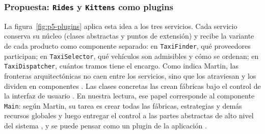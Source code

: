 \subsubsection{Propuesta: \texttt{Rides} y \texttt{Kittens} como plugins}

La figura~\ref{fig:p5-plugins} aplica esta idea a los tres servicios. Cada servicio conserva su
núcleo (clases abstractas y puntos de extensión) y recibe la variante de cada producto como
componente separado: en \texttt{TaxiFinder}, qué proveedores participan; en \texttt{TaxiSelector},
qué vehículos son admisibles y cómo se ordenan; en \texttt{TaxiDispatcher}, cuántos tramos tiene el
encargo. Como indica Martin, las fronteras arquitectónicas no caen entre los servicios, sino que los
atraviesan y los dividen en componentes \parencite[p.~246]{martin2017clean}. Las clases concretas
las crean fábricas bajo el control de la interfaz de usuario \parencite[p.~244]{martin2017clean}. En
nuestra lectura, ese papel corresponde al componente \texttt{Main}: según Martin, su tarea es crear
todas las fábricas, estrategias y demás recursos globales y luego entregar el control a las partes
abstractas de alto nivel del sistema \parencite[p.~232]{martin2017clean}, y se puede pensar como un
plugin de la aplicación \parencite[p.~237]{martin2017clean}.

